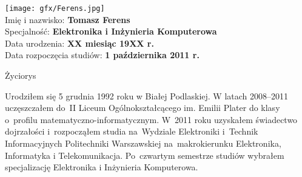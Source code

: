 \newpage
{
\vfill

\texttt{[image: gfx/Ferens.jpg]} \\ \medskip 
\vspace{3mm} 
\hfill Imię i nazwisko: \textbf{Tomasz Ferens}  \\
\vspace{3mm} 
\hfill Specjalność: \textbf{Elektronika i Inżynieria Komputerowa}  \\ 
\vspace{3mm}   
\hfill Data urodzenia: \textbf{XX miesiąc 19XX r. }  \\ 
\vspace{3mm} 
\hfill Data rozpoczęcia studiów: \textbf{1 października 2011 r. }  \\ 
\vfill
\begin{center}
{ {\LARGE Życiorys} } \\ \bigskip
\end{center}

\vspace{2cm}
\hspace{1cm} Urodziłem się 5 grudnia 1992 roku w Białej Podlaskiej. W latach 2008--2011
uczęszczałem do~II Liceum Ogólnokształcącego im. Emilii Plater do klasy o~profilu matematyczno-informatycznym. W~2011 roku uzyskałem świadectwo dojrzałości i~rozpocząłem studia na~Wydziale Elektroniki i~Technik Informacyjnych Politechniki Warszawskiej na~makrokierunku Elektronika, Informatyka i Telekomunikacja. Po~czwartym semestrze studiów wybrałem
specjalizację Elektronika i Inżynieria Komputerowa. \\ 
\vfill
\vspace{4cm}
}
